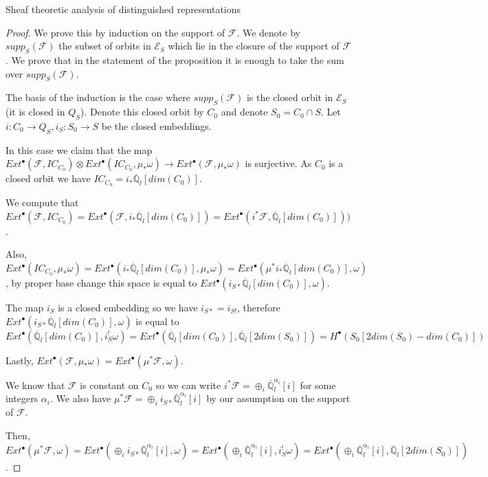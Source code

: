\documentclass[12pt]{article}
\newcommand{\Q}{\mathbb{Q}}
\newcommand{\<}{\langle}
\renewcommand{\>}{\rangle}
\theoremstyle{plain}
\theoremstyle{definition}
\begin{document}
\begin{section}{Sheaf theoretic analysis of distinguished representations}
\begin{proof}
    We prove this by induction on the support of $\mathcal{F}$. We denote by $supp_S(\mathcal{F})$ the subset of orbits in $\mathcal{E}_S$ which lie in the closure of the support of $\mathcal{F}$. We prove that in the statement of the proposition it is enough to take the sum over $supp_S(\mathcal{F})$.
    
    The basis of the induction is the case where $supp_S(\mathcal{F})$ is the closed orbit in $\mathcal{E}_S$ (it is closed in $Q_S$). Denote this closed orbit by $C_0$ and denote $S_0=C_0\cap S$. Let $i:C_0\rightarrow Q_S,i_S:S_0\rightarrow S$ be the closed embeddings. 

    In this case we claim that the map $Ext^{\bullet}(\mathcal{F},IC_{C_0})\otimes Ext^\bullet(IC_{C_0},\mu_*\omega)\rightarrow Ext^\bullet(\mathcal{F},\mu_*\omega)$ is surjective. As $C_0$ is a closed orbit we have $IC_{C_0}=i_*\overline{\Q}_l[dim(C_0)]$.

    We compute that $Ext^{\bullet}(\mathcal{F},IC_{C_0})=Ext^{\bullet}(\mathcal{F},i_*\overline{\Q}_l[dim(C_0)])=Ext^\bullet(i^*\mathcal{F},\overline{\Q}_l[dim(C_0)]))$.
    
    Also, $Ext^\bullet(IC_{C_0},\mu_*\omega)=Ext^\bullet(i_*\overline{\Q}_l[dim(C_0)],\mu_*\omega)=Ext^\bullet(\mu^*i_*\overline{\Q}_l[dim(C_0)],\omega)$, by proper base change this space is equal to $Ext^\bullet(i_{S*}\overline{\Q}_l[dim(C_0)],\omega)$. 
    
    The map $i_S$ is a closed embedding so we have $i_{S*}=i_{S!}$, therefore $Ext^\bullet(i_{S*}\overline{\Q}_l[dim(C_0)],\omega)$ is equal to $$Ext^\bullet(\overline{\Q}_l[dim(C_0)],i_S^!\omega)=Ext^\bullet(\overline{\Q}_l[dim(C_0)],\overline{\Q}_l[2dim(S_0)])=H^\bullet(S_0[2dim(S_0)-dim(C_0)])$$  
    
    Lastly, $Ext^\bullet(\mathcal{F},\mu_*\omega)=Ext^\bullet(\mu^*\mathcal{F},\omega)$.

    We know that $\mathcal{F}$ is constant on $C_0$ so we can write $i^*\mathcal{F}=\oplus_i\overline{\Q}_l^{\alpha_i}[i]$ for some integers $\alpha_i$. We also have $\mu^*\mathcal{F}=\oplus_i i_{S*}\overline{\Q}_l^{\alpha_i}[i]$ by our assumption on the support of $\mathcal{F}$.
    
    Then, $Ext^\bullet(\mu^*\mathcal{F},\omega)=Ext^\bullet(\oplus_i i_{S*}\overline{\Q}_l^{\alpha_i}[i],\omega)=Ext^\bullet(\oplus_i \overline{\Q}_l^{\alpha_i}[i],i^!_{S}\omega)=Ext^\bullet(\oplus_i \overline{\Q}_l^{\alpha_i}[i],\overline{\Q}_l[2dim(S_0)])$.


\end{proof}
\end{section}
\end{document}
